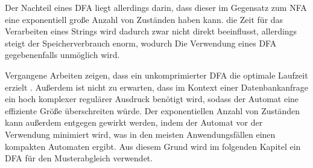 Der Nachteil eines DFA liegt allerdings darin, dass dieser im Gegensatz zum NFA eine exponentiell große Anzahl von Zuständen haben kann.
die Zeit für das Verarbeiten eines Strings wird dadurch zwar nicht direkt beeinflusst, allerdings steigt der Speicherverbrauch enorm, wodurch Die Verwendung eines DFA gegebenenfalls unmöglich wird.

Vergangene Arbeiten zeigen, dass ein unkomprimierter DFA die optimale Laufzeit erzielt \cite{Yu2013}.
Außerdem ist nicht zu erwarten, dass im Kontext einer Datenbankanfrage ein hoch komplexer regulärer Ausdruck benötigt wird, sodass der Automat eine effiziente Größe überschreiten würde.
Der exponentiellen Anzahl von Zuständen kann außerdem entgegen gewirkt werden, indem der Automat vor der Verwendung minimiert wird, was in den meisten Anwendungsfällen einen kompakten Automaten ergibt.
Aus diesem Grund wird im folgenden Kapitel ein DFA für den Musterabgleich verwendet.
